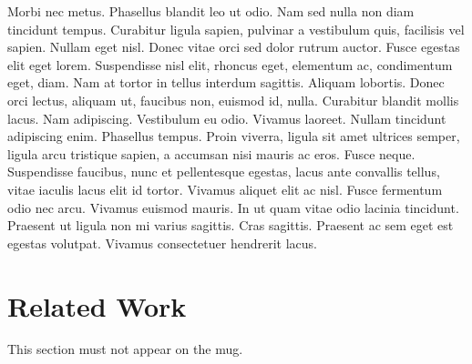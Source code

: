 \documentclass[conference]{IEEEtran}
\begin{document}
Morbi nec metus. Phasellus blandit leo ut odio. Nam sed nulla non diam tincidunt tempus. Curabitur ligula sapien, pulvinar a vestibulum quis, facilisis vel sapien. Nullam eget nisl. Donec vitae orci sed dolor rutrum auctor. Fusce egestas elit eget lorem. Suspendisse nisl elit, rhoncus eget, elementum ac, condimentum eget, diam. Nam at tortor in tellus interdum sagittis. Aliquam lobortis. Donec orci lectus, aliquam ut, faucibus non, euismod id, nulla. Curabitur blandit mollis lacus. Nam adipiscing. Vestibulum eu odio. Vivamus laoreet. Nullam tincidunt adipiscing enim. Phasellus tempus. Proin viverra, ligula sit amet ultrices semper, ligula arcu tristique sapien, a accumsan nisi mauris ac eros. Fusce neque. Suspendisse faucibus, nunc et pellentesque egestas, lacus ante convallis tellus, vitae iaculis lacus elit id tortor. Vivamus aliquet elit ac nisl. Fusce fermentum odio nec arcu. Vivamus euismod mauris. In ut quam vitae odio lacinia tincidunt. Praesent ut ligula non mi varius sagittis. Cras sagittis. Praesent ac sem eget est egestas volutpat. Vivamus consectetuer hendrerit lacus.

\section{Related Work}
This section must not appear on the mug.



\end{document}
